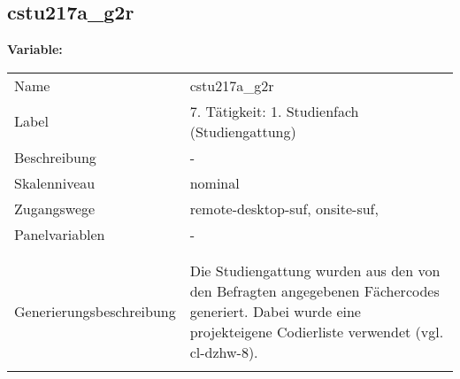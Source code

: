 	
	
	\subsection{cstu217a\_g2r}
	\label{subSection:cstu217a_g2r}

	\noindent\textbf{Variable:}\\
		\begin{tabular}{lL{11.3cm}}
			\label{tableVariable:cstu217a_g2r}
			Name & cstu217a\_g2r \\
			Label & 7. Tätigkeit: 1. Studienfach (Studiengattung) \\
			Beschreibung & - \\
			Skalenniveau & nominal \\
			Zugangswege &
				remote-desktop-suf,
				onsite-suf,
 \\
			Panelvariablen & -
			 \\
			 \\
 \\
					Generierungsbeschreibung & Die Studiengattung wurden aus den von den Befragten angegebenen Fächercodes generiert.  Dabei wurde eine projekteigene Codierliste verwendet (vgl. cl-dzhw-8).
				 \\	
			 \\
		\end{tabular}






